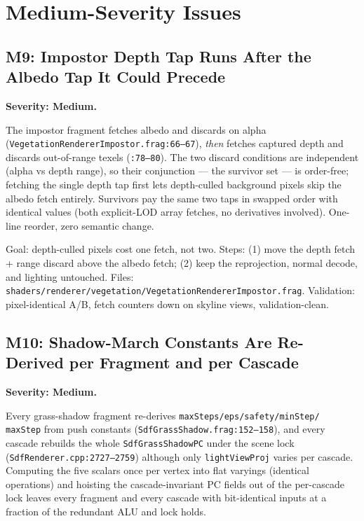 \documentclass[11pt,a4paper]{article}
\begin{document}
\section{Medium-Severity Issues}

\subsection{M9: Impostor Depth Tap Runs After the Albedo Tap It Could Precede}

\textbf{Severity: Medium.}

The impostor fragment fetches albedo and discards on alpha
(\texttt{VegetationRendererImpostor.frag:66--67}), \emph{then} fetches
captured depth and discards out-of-range texels (\texttt{:78--80}). The two
discard conditions are independent (alpha vs depth range), so their
conjunction --- the survivor set --- is order-free; fetching the single
depth tap first lets depth-culled background pixels skip the albedo fetch
entirely. Survivors pay the same two taps in swapped order with identical
values (both explicit-LOD array fetches, no derivatives involved). One-line
reorder, zero semantic change.

\begin{tcolorbox}[promptbox={Prompt --- M9: depth-tap-first impostor discard}]
Goal: depth-culled pixels cost one fetch, not two. Steps: (1) move the
depth fetch + range discard above the albedo fetch; (2) keep the
reprojection, normal decode, and lighting untouched. Files:
\texttt{shaders/renderer/vegetation/VegetationRendererImpostor.frag}.
Validation: pixel-identical A/B, fetch counters down on skyline views,
validation-clean.
\end{tcolorbox}

\subsection{M10: Shadow-March Constants Are Re-Derived per Fragment and per Cascade}

\textbf{Severity: Medium.}

Every grass-shadow fragment re-derives \texttt{maxSteps/eps/safety/minStep/
maxStep} from push constants (\texttt{SdfGrassShadow.frag:152--158}),
and every cascade rebuilds the whole \texttt{SdfGrassShadowPC} under the
scene lock (\texttt{SdfRenderer.cpp:2727--2759}) although only
\texttt{lightViewProj} varies per cascade. Computing the five scalars once
per vertex into flat varyings (identical operations) and hoisting the
cascade-invariant PC fields out of the per-cascade lock leaves every
fragment and every cascade with bit-identical inputs at a fraction of the
redundant ALU and lock holds.
\end{document}
